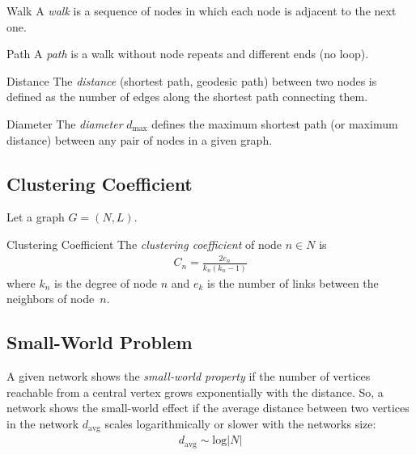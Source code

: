 \documentclass[english]{panikzettel}
\begin{document}
\begin{halfboxl}
	\vspace{-\baselineskip}
	\begin{defi}{Walk}
		A \emph{walk} is a sequence of nodes in which each node is adjacent to the next one.
	\end{defi}
\end{halfboxl}%
\begin{halfboxr}
	\vspace{-\baselineskip}
	\begin{defi}{Path}
		A \emph{path} is a walk without node repeats and different ends (no loop).
	\end{defi}
\end{halfboxr}

\begin{halfboxl}
	\vspace{-\baselineskip}
	\begin{defi}{Distance}
		The \emph{distance} (shortest path, geodesic path) between two nodes is defined as the number of edges along the shortest path connecting them.
	\end{defi}
\end{halfboxl}%
\begin{halfboxr}
	\vspace{-\baselineskip}
	\begin{defi}{Diameter}
		The \emph{diameter} $ d_\text{max} $ defines the maximum shortest path (or maximum distance) between any pair of nodes in a given graph.
	\end{defi}
\end{halfboxr}

\subsection{Clustering Coefficient} \label{sec:clustering_coefficient}
Let a graph $ G = (N,L) $.

\begin{defi}{Clustering Coefficient}
	The \textit{clustering coefficient} of node $ n \in N $ is
	\begin{align*}
		C_n = \frac{2 e_n}{k_n (k_n - 1)}
	\end{align*}
	where $ k_n $ is the degree of node $ n $ and $ e_k $ is the number of links between the neighbors of node~$ n $.
\end{defi}

\subsection{Small-World Problem}\label{sec:small_world_problem}
A given network shows the \textit{small-world property} if the number of vertices reachable from a central vertex grows exponentially with the distance.
So, a network shows the small-world effect if the average distance between two vertices in the network $ d_\text{avg} $ scales logarithmically or slower with the networks size:
\begin{align*}
	d_\text{avg} \sim \text{log} |N|
\end{align*}
\end{document}
